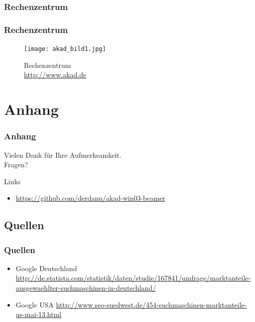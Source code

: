\documentclass[xcolor=dvipsnames]{beamer}
\begin{document}
\subsubsection{Rechenzentrum}
\begin{frame}
  \frametitle{Rechenzentrum}
	\begin{figure}
		\texttt{[image: akad\_bild1.jpg]}
		\caption{Rechenzentrum \\ \tiny{\textcolor{gray}{\url{http://www.akad.de}}}}
		\end{figure}
\end{frame}



\section{Anhang}
\begin{frame}
  \frametitle{Anhang} %
	\begin{block}{}	
		\begin{center}
			Vielen Dank für Ihre Aufmerksamkeit. \\
			Fragen?
		\end{center}	
	\end{block}
	\begin{block}{Links}	
		\begin{itemize}
			\item \url{https://github.com/derdanu/akad-win03-beamer}	
		\end{itemize}
	\end{block}
\end{frame}

\subsection{Quellen}
\begin{frame} %
  \frametitle{Quellen} %
 	\begin{itemize}
		\item Google Deutschland \url{http://de.statista.com/statistik/daten/studie/167841/umfrage/marktanteile-ausgewaehlter-suchmaschinen-in-deutschland/}
		\item Google USA \url{http://www.seo-suedwest.de/454-suchmaschinen-marktanteile-us-mai-13.html
}
	\end{itemize}
\end{frame}
\end{document}
